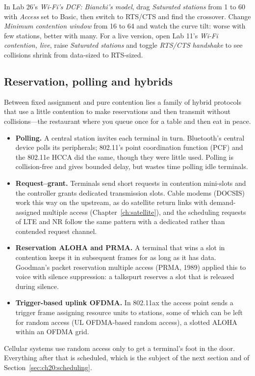 \begin{tryit}
In Lab 26's \emph{Wi-Fi's DCF: Bianchi's model}, drag \emph{Saturated stations} from 1 to 60 with
\emph{Access} set to Basic, then switch to RTS/CTS and find the crossover. Change \emph{Minimum contention
window} from 16 to 64 and watch the curve tilt: worse with few stations, better with many. For a live
version, open Lab 11's \emph{Wi-Fi contention, live}, raise \emph{Saturated stations} and toggle
\emph{RTS/CTS handshake} to see collisions shrink from data-sized to RTS-sized.
\end{tryit}

\subsection{Reservation, polling and hybrids}

Between fixed assignment and pure contention lies a family of hybrid protocols that use a little contention
to make reservations and then transmit without collisions---the restaurant where you queue once for a table
and then eat in peace.


\begin{itemize}
\item \textbf{Polling.} A central station invites each terminal in turn. Bluetooth's central device polls
its peripherals; 802.11's point coordination function (PCF) and the 802.11e HCCA did the same, though they were
little used. Polling is collision-free and gives bounded delay, but wastes time polling idle terminals.
\item \textbf{Request--grant.} Terminals send short requests in contention mini-slots and the controller
grants dedicated transmission slots. Cable modems (DOCSIS) work this way on the upstream, as do satellite
return links with demand-assigned multiple access (Chapter~\ref{ch:satellite}), and the scheduling requests
of LTE and NR follow the same pattern with a dedicated rather than contended request channel.
\item \textbf{Reservation ALOHA and PRMA.} A terminal that wins a slot in contention keeps it in subsequent
frames for as long as it has data. Goodman's packet reservation multiple access (PRMA, 1989) applied this to
voice with silence suppression: a talkspurt reserves a slot that is released during silence.
\item \textbf{Trigger-based uplink OFDMA.} In 802.11ax the access point sends a trigger frame assigning
resource units to stations, some of which can be left for random access (UL OFDMA-based random access),
a slotted ALOHA within an OFDMA grid.
\end{itemize}
Cellular systems use random access only to get a terminal's foot in the door. Everything after that is
scheduled, which is the subject of the next section and of Section~\ref{sec:ch20:scheduling}.

